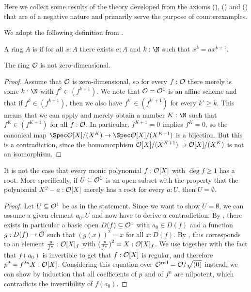 Here we collect some results of
the theory developed from the axioms
(), () and ()
that are of a negative nature
and primarily serve the purpose of counterexamples.

We adopt the following definition from
\cite[Section IV.8]{lombardi-quitte}.

\begin{definition}%
  \label{zero-dimensional-ring}
  A ring $A$ is 
  if for all $x : A$
  there exists $a : A$ and $k : \N$
  such that $x^k = a x^{k + 1}$.
\end{definition}

\begin{lemma}%
  \label{R-not-zero-dimensional}
  The ring $\mathcal O$ is not zero-dimensional.
\end{lemma}

\begin{proof}
  Assume that $\mathcal O$ is zero-dimensional,
  so for every $f : \mathcal O$ there merely is some $k : \N$ with $f^k \in (f^{k + 1})$.
  We note that $\mathcal O = \mathcal O^1$ is an affine scheme and
  that if $f^k \in (f^{k + 1})$,
  then we also have $f^{k'} \in (f^{k' + 1})$ for every $k' \geq k$.
  This means that we can apply 
  and merely obtain a number $K : \N$
  such that $f^K \in (f^{K + 1})$ for all $f : \mathcal O$.
  In particular, $f^{K + 1} = 0$ implies $f^K = 0$,
  so the canonical map
  $\Spec \A[X]/(X^K) \to \Spec \A[X]/(X^{K + 1})$
  is a bijection.
  But this is a contradiction,
  since the homomorphism $\mathcal O[X]/(X^{K + 1}) \to \mathcal O[X]/(X^K)$
  is not an isomorphism.
\end{proof}

\begin{example}%
  \label{non-existence-of-roots}
  It is not the case that
  every monic polynomial $f : \mathcal O[X]$ with $\deg f \geq 1$ has a root.
  More specifically,
  if $U \subseteq \mathcal O^1$ is an open subset
  with the property that
  the polynomial $X^2 - a : \mathcal O[X]$ merely has a root
  for every $a : U$,
  then $U = \emptyset$.
\end{example}

\begin{proof}
  Let $U \subseteq \mathcal O^1$ be as in the statement.
  Since we want to show $U = \emptyset$,
  we can assume a given element $a_0 : U$
  and now have to derive a contradiction.
  By ,
  there exists in particular a basic open $D(f) \subseteq \mathcal O^1$
  with $a_0 \in D(f)$
  and a function $g : D(f) \to \mathcal O$
  such that ${(g(x))}^2 = x$ for all $x : D(f)$.
  By ,
  this corresponds to an element $\frac{p}{f^n} : \mathcal O[X]_f$
  with ${(\frac{p}{f^n})}^2 = X : \mathcal O[X]_f$.
  We use 
  together with the fact that $f(a_0)$ is invertible
  to get that $f : \mathcal O[X]$ is regular,
  and therefore $p^2 = f^{2n}X : \mathcal O[X]$.
  Considering this equation over $\mathcal O^{\mathrm{red}} = \mathcal O/\sqrt{(0)}$ instead,
  we can show by induction that all coefficients of $p$ and of $f^n$ are nilpotent,
  which contradicts the invertibility of $f(a_0)$.
\end{proof}

